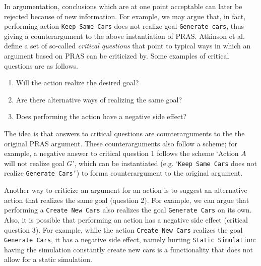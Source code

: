 In argumentation, conclusions which are at one point acceptable can later be rejected because of new information. For example, we may argue that, in fact, performing action \texttt{Keep Same Cars} does not realize goal \texttt{Generate cars}, thus giving a counterargument to the above instantiation of PRAS. Atkinson et al.~\cite{atkinson2007} define a set of so-called \emph{critical questions} that point to typical ways in which an argument based on PRAS can be criticized by. Some examples of critical questions are as follows.

\begin{enumerate}
\item Will the action realize the desired goal?
\item Are there alternative ways of realizing the same goal?
\item Does performing the action have a negative side effect?
\end{enumerate}

The idea is that answers to critical questions are counterarguments to the the original PRAS argument. These counterarguments also follow a scheme; for example, a negative answer to critical question 1 follows the scheme `Action $A$ will not realize goal $G$', which can be instantiated (e.g. `\texttt{Keep Same Cars} does not realize \texttt{Generate Cars'}) to forma counterargument to the original argument. 

Another way to criticize an argument for an action is to suggest an alternative action that realizes the same goal (question 2). For example, we can argue that performing a \texttt{Create New Cars} also realizes the goal \texttt{Generate Cars} on its own. Also, it is possible that performing an action has a negative side effect (critical question 3). For example, while the action \texttt{Create New Cars} realizes the goal \texttt{Generate Cars}, it has a negative side effect, namely hurting \texttt{Static Simulation}: having the simulation constantly create new cars is a functionality that does not allow for a static simulation. 

